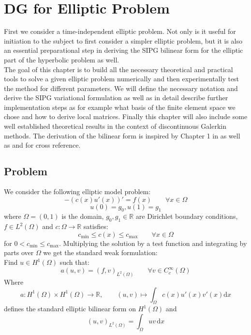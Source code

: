 \chapter{DG for Elliptic Problem}

First we consider a time-independent elliptic problem. Not only is it
useful for initiation to the subject to first consider a simpler elliptic problem, but it
is also an essential preparational step in deriving the SIPG bilinear form for the
elliptic part of the hyperbolic problem as well.
\\
The goal of this chapter is to build all the necessary theoretical and practical
tools to solve a given elliptic problem
numerically and then experimentally test the method for different parameters.
We will define the necessary notation and derive
the SIPG variational formulation as well as in detail describe further implementation steps as
for example what basis of the finite element space we chose and how to derive local matrices.
Finally this chapter will also include some well established theoretical results in
the context of discontinuous Galerkin methods.
The derivation
of the bilinear form is inspired by
Chapter 1 in \cite{riviere2008} as well as \cite{georgoulis2011Springer} and \cite{grote2006}
for cross reference.

\section{Problem}
We consider the following elliptic model problem:
\begin{equation}
	\label{eq:elliptic_pde}
	-(c(x)u'(x))' = f(x) \qquad \forall x\in \Omega
\end{equation}
\begin{equation}
	\label{eq:elliptic_pde_bc}
	u(0) = g_0, u(1) = g_1
\end{equation}
where $\Omega = (0,1)$ is the domain, $g_0, g_1 \in \mathbb{R}$ are
Dirichlet boundary conditions, $f \in L^2(\Omega)$ and $c:\Omega \to \mathbb{R}$
satisfies:
\[
	c_{\min} \leq c(x) \leq c_{\max} \qquad \forall x\in \Omega
\]
for $0 < c_{\min} \leq c_{\max}$.
Multiplying the solution by a test function and integrating by parts over $\Omega$ we get the
standard weak formulation: \\
Find $u \in H^1(\Omega)$ such that:
\begin{equation}
	a(u,v) = (f,v)_{L^2(\Omega)} \qquad \forall v \in C_c^{\infty}(\Omega)
\end{equation}
Where
\[
	a:H^1(\Omega) \times H^1(\Omega) \to \mathbb{R}, \qquad (u,v) \mapsto \int_{\Omega} c(x)u'(x)v'(x) \text{d}x
\]
defines the standard elliptic bilinear form on $H^1(\Omega)$ and
\[
	(u,v)_{L^2(\Omega)} = \int_{\Omega} uv \,\text{d}x
\]

